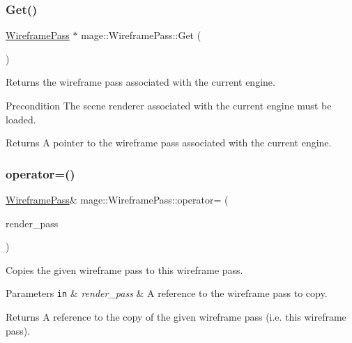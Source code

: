 \subsubsection{\texorpdfstring{Get()}{Get()}}
{\footnotesize\ttfamily \hyperlink{classmage_1_1_wireframe_pass}{Wireframe\+Pass} $\ast$ mage\+::\+Wireframe\+Pass\+::\+Get (\begin{DoxyParamCaption}{ }\end{DoxyParamCaption})\hspace{0.3cm}{\ttfamily [static]}}

Returns the wireframe pass associated with the current engine.

\begin{DoxyPrecond}{Precondition}
The scene renderer associated with the current engine must be loaded. 
\end{DoxyPrecond}
\begin{DoxyReturn}{Returns}
A pointer to the wireframe pass associated with the current engine. 
\end{DoxyReturn}
\hypertarget{classmage_1_1_wireframe_pass_a57da0b468c68c8653ebc639923b111ba}{}\label{classmage_1_1_wireframe_pass_a57da0b468c68c8653ebc639923b111ba} 
\subsubsection{\texorpdfstring{operator=()}{operator=()}\hspace{0.1cm}{\footnotesize\ttfamily [1/2]}}
{\footnotesize\ttfamily \hyperlink{classmage_1_1_wireframe_pass}{Wireframe\+Pass}\& mage\+::\+Wireframe\+Pass\+::operator= (\begin{DoxyParamCaption}\item[{const \hyperlink{classmage_1_1_wireframe_pass}{Wireframe\+Pass} \&}]{render\+\_\+pass }\end{DoxyParamCaption})\hspace{0.3cm}{\ttfamily [delete]}}

Copies the given wireframe pass to this wireframe pass.


\begin{DoxyParams}[1]{Parameters}
\mbox{\tt in}  & {\em render\+\_\+pass} & A reference to the wireframe pass to copy. \\
\hline
\end{DoxyParams}
\begin{DoxyReturn}{Returns}
A reference to the copy of the given wireframe pass (i.\+e. this wireframe pass). 
\end{DoxyReturn}
\hypertarget{classmage_1_1_wireframe_pass_abd90640d63b9ce0c44b87de87d06910c}{}\label{classmage_1_1_wireframe_pass_abd90640d63b9ce0c44b87de87d06910c} 
